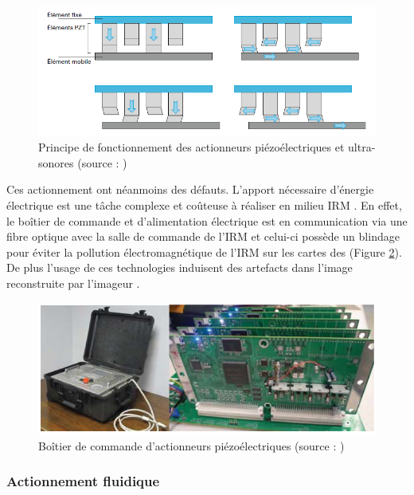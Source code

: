 \documentclass[10pt, a4paper]{article}
\begin{document}
\begin{figure}[ht!]
\centering
\includegraphics[scale=0.5]{ImageIntro/Indenteur.PNG}
\caption{ Principe de fonctionnement des actionneurs piézoélectriques et ultra-sonores (source : \cite{Lambert2016})}
\label{fig:indenteur}
\end{figure} 

         Ces actionnement ont néanmoins des défauts. L'apport nécessaire d'énergie électrique est une tâche complexe et coûteuse à réaliser en milieu IRM \cite{Su2012}. En effet, le boîtier de commande et d'alimentation électrique est en communication via une fibre optique avec la salle de commande de l'IRM et celui-ci possède un blindage pour éviter la pollution électromagnétique de l'IRM sur les cartes des (Figure \ref{fig:CommandePiezo}). De plus l'usage de ces technologies induisent des artefacts dans l'image reconstruite par l'imageur \cite{Wendt2000}.
        
\begin{figure}[ht!]
\centering
\includegraphics[scale=0.5]{ImageIntro/CommandePiezo.PNG}
\caption{ Boîtier de commande d'actionneurs piézoélectriques (source : \cite{Su2012})}
\label{fig:CommandePiezo}
\end{figure} 
            
        \subsubsection{Actionnement fluidique}
        
\end{document}
